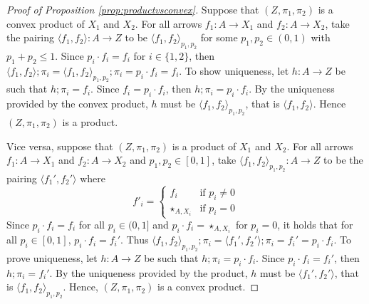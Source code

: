 \begin{proof}[Proof of Proposition \ref{prop:productvsconvex}]%
Suppose that $(Z,\pi_1,\pi_2)$ is a convex product of $X_1$ and $X_2$. For all arrows $f_1\colon A \to X_1$ and $f_2\colon A \to X_2$, take the pairing $\langle f_1,f_2\rangle\colon A \to Z$ to be $\langle f_1,f_2\rangle_{p_1,p_2}$ for some $p_1,p_2\in (0,1)$ with $p_1+p_2\leq 1$. Since $p_i\cdot f_i = f_i$ for $i\in\{1,2\}$, then $\langle f_1,f_2\rangle ; \pi_i =  \langle f_1,f_2\rangle_{p_1,p_2};\pi_i= p_i\cdot f_i =f_i$. To show uniqueness, let $h\colon A \to Z$ be such that $h;\pi_i =f_i$. Since $f_i = p_i\cdot f_i $, then $h;\pi_i =p_i\cdot f_i$. By the uniqueness provided by the convex product, $h$ must be $\langle f_1,f_2\rangle_{p_1,p_2}$, that is $\langle f_1,f_2\rangle$. Hence $(Z,\pi_1,\pi_2)$ is a product.

Vice versa, suppose that $(Z,\pi_1,\pi_2)$ is a product of $X_1$ and $X_2$. For all arrows $f_1\colon A \to X_1$ and $f_2\colon A \to X_2$ and $p_1,p_2\in[0,1]$, take $\langle f_1,f_2 \rangle_{p_1,p_2}\colon A \to Z$ to be the pairing $\langle f_1',f_2' \rangle$ where 
\[
f'_i = \begin{cases} 
f_i &\text{if }p_i \neq 0 \\
\star_{A,X_i} &\text{if }p_i=0\end{cases}
\]
Since $p_i\cdot f_i=f_i$ for all $p_i\in (0,1]$ and $p_i \cdot f_i =\star_{A,X_i}$ for $p_i=0$, it holds that for all $p_i\in[0,1]$, $p_i \cdot f_i =f_i'$.
Thus $\langle f_1,f_2 \rangle_{p_1,p_2}; \pi_i = \langle f_1',f_2' \rangle;\pi_i =f_i' =p_i \cdot f_i$. To prove uniqueness, let $h\colon A \to Z$ be such that $h;\pi_i =p_i\cdot f_i$. Since $p_i\cdot f_i = f_i'$, then $h;\pi_i = f_i '$. 
By the uniqueness provided by the product, $h$ must be $\langle f_1',f_2'\rangle$, that is $\langle f_1,f_2 \rangle_{p_1,p_2}$. Hence, $(Z,\pi_1,\pi_2)$ is a convex product.
\end{proof}

